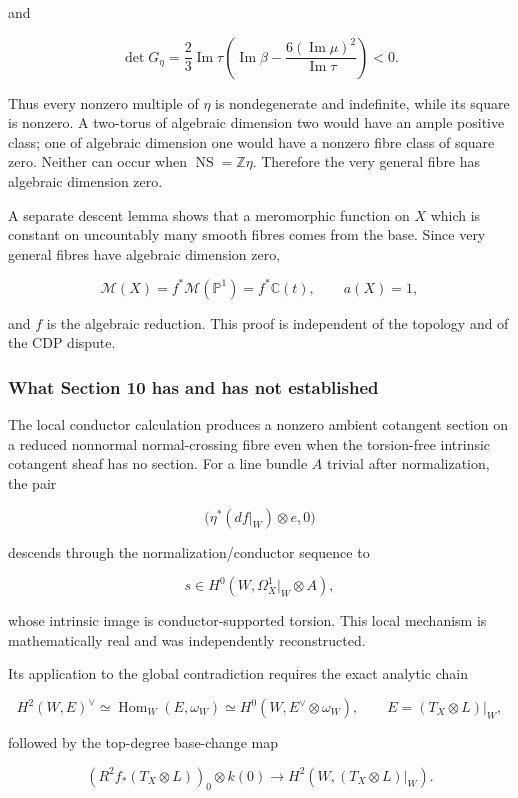 \documentclass[
  10pt,
  letterpaper,
]{article}
\begin{document}
and

\[
\det G_\eta=\frac{2}{3}\operatorname{Im}\tau
\left(\operatorname{Im}\beta-\frac{6(\operatorname{Im}\mu)^2}{\operatorname{Im}\tau}\right)<0.
\]

Thus every nonzero multiple of \(\eta\) is nondegenerate and indefinite,
while its square is nonzero. A two-torus of algebraic dimension two
would have an ample positive class; one of algebraic dimension one would
have a nonzero fibre class of square zero. Neither can occur when
\(\operatorname{NS}=\mathbb Z\eta\). Therefore the very general fibre
has algebraic dimension zero.

A separate descent lemma shows that a meromorphic function on \(X\)
which is constant on uncountably many smooth fibres comes from the base.
Since very general fibres have algebraic dimension zero,

\[
\mathcal M(X)=f^*\mathcal M(\mathbb P^1)=f^*\mathbb C(t),
\qquad
a(X)=1,
\]

and \(f\) is the algebraic reduction. This proof is independent of the
topology and of the CDP dispute.

\subsubsection{What Section 10 has and has not
established}\label{what-section-10-has-and-has-not-established}

The local conductor calculation produces a nonzero ambient cotangent
section on a reduced nonnormal normal-crossing fibre even when the
torsion-free intrinsic cotangent sheaf has no section. For a line bundle
\(A\) trivial after normalization, the pair

\[
\bigl(\eta^*(df|_W)\otimes e,0\bigr)
\]

descends through the normalization/conductor sequence to

\[
s\in H^0(W,\Omega_X^1|_W\otimes A),
\]

whose intrinsic image is conductor-supported torsion. This local
mechanism is mathematically real and was independently reconstructed.

Its application to the global contradiction requires the exact analytic
chain

\[
H^2(W,E)^\vee
\simeq \operatorname{Hom}_W(E,\omega_W)
\simeq H^0(W,E^\vee\otimes\omega_W),
\qquad E=(T_X\otimes L)|_W,
\]

followed by the top-degree base-change map

\[
(R^2f_*(T_X\otimes L))_0\otimes k(0)
\longrightarrow H^2(W,(T_X\otimes L)|_W).
\]
\end{document}
